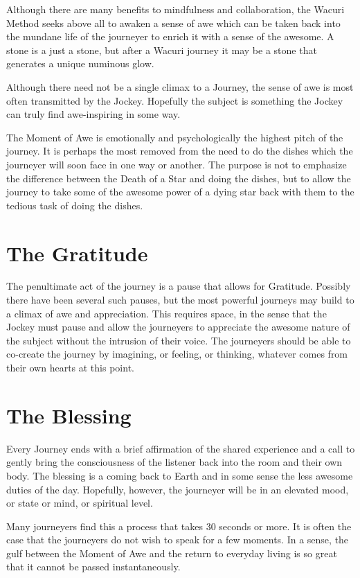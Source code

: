 \documentclass[12pt]{book}
\begin{document}
Although there are many benefits to mindfulness and collaboration, the Wacuri Method seeks above all to awaken a sense of awe which can be taken back into the mundane life of the journeyer to enrich it with a sense of the awesome. A stone is a just a stone, but after a Wacuri journey it may be a stone that generates a unique numinous glow.
					
Although there need not be a single climax to a Journey, the sense of awe is most often transmitted by the Jockey. Hopefully the subject is something the Jockey can truly find awe-inspiring in some way.
					
The Moment of Awe is emotionally and psychologically the highest pitch of the journey. It is perhaps the most removed from the need to do the dishes which the journeyer will soon face in one way or another. The purpose is not to emphasize the difference between the Death of a Star and doing the dishes, but to allow the journey to take some of the awesome power of a dying star back with them to the tedious task of doing the dishes.
					
\section{The Gratitude}
					
The penultimate act of the journey is a pause that allows for Gratitude. Possibly there have been several such pauses, but the most powerful journeys may build to a climax of awe and appreciation. This requires space, in the sense that the Jockey must pause and allow the journeyers to appreciate the awesome nature of the subject without the intrusion of their voice. The journeyers should be able to co-create the journey by imagining, or feeling, or thinking, whatever comes from their own hearts at this point.

\section{The Blessing}
					
Every Journey ends with a brief affirmation of the shared experience and a call to gently bring the consciousness of the listener back into the room and their own body. The blessing is a coming back to Earth and in some sense the less awesome duties of the day. Hopefully, however, the journeyer will be in an elevated mood, or state or mind, or spiritual level.
					
Many journeyers find this a process that takes 30 seconds or more. It is often the case that the journeyers do not wish to speak for a few moments. In a sense, the gulf between the Moment of Awe and the return to everyday living is so great that it cannot be passed instantaneously.
					
\end{document}
